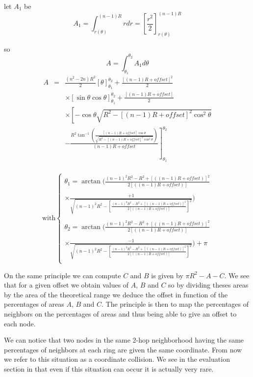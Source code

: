 \documentclass[a4paper]{article}
\begin{document}
let $A_{1}$ be
\[A_{1}=\int_{r(\theta)}^{(n-1)R}rdr=\left[ \frac{r^2}{2} \right]_{r(\theta)}^{(n-1)R}\] 


so
\[ A=\int_{\theta_{1}}^{\theta_{2}}A_{1}d\theta \]
\begin{eqnarray*}
  A & = &\frac{(n^2-2n)R^2}{2} \left[ \theta \right]_{\theta_{1}}^{\theta_{2}} + \frac{\left[ (n-1)R+offset \right]^2}{2} \\
  & & \times \left[ \sin \theta \cos \theta \right]_{\theta_{1}}^{\theta_{2}} + \frac{\left[ (n-1)R+offset \right]}{2} \\
  & & \times \left[ -\cos \theta \sqrt{R^2-[(n-1)R+offset]^2 \cos^2 \theta} \right.\\ 
  & & \left. - \frac{R^2 \tan^{-1}(\frac{[(n-1)R+offset]\cos \theta}{\sqrt{R^2-[(n-1)R+offset]^2 \cos^2 \theta}})}{(n-1)R+offset} \right]_{\theta_{1}}^{\theta_{2}} \\
\end{eqnarray*}


\[ \mbox{with}\left\{
  \begin{array}{ll}
   \theta_{1}=\arctan(\frac{(n-1)^2R^2-R^2+[((n-1)R+offset)]^2}{2[((n-1)R+offset)]} \\ \\ \times \frac{+1}{\sqrt{(n-1)^2R^2-[\frac{(n-1)^2R^2-R^2+[((n-1)R+offset)]^2}{2[((n-1)R+offset)]}]^2}})\\ \\
   \theta_{2}=\arctan(\frac{(n-1)^2R^2-R^2+[((n-1)R+offset)]^2}{2[((n-1)R+offset)]} \\ \\ \times \frac{-1}{\sqrt{(n-1)^2R^2-[\frac{(n-1)^2R^2-R^2+[((n-1)R+offset)]^2}{2[((n-1)R+offset)]}]^2}})+\pi\\
  \end{array} 
\right.
\]

On the same principle we can compute $C$ and $B$ is given by $\pi R^{2}-A-C$. We see that for a given offset we obtain values of $A$, $B$ and $C$ so by dividing theses areas by the area of the theoretical range we deduce the offset in function of the percentages of areas $A$, $B$ and $C$. The principle is then to map the percentages of neighbors on the percentages of areas and thus being able to give an offset to each node.


We can notice that two nodes in the same 2-hop neighborhood having the same percentages of neighbors at each ring are given the same coordinate. From now we refer to this situation as a coordinate collision. We see in the evaluation section in that even if this situation can occur it is actually very rare. 
\end{document}
